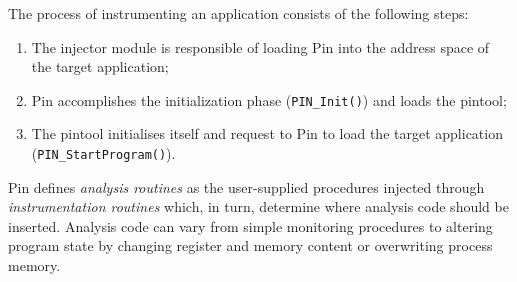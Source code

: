 \documentclass[LaM,binding=0.6cm]{sapthesis}
\begin{document}
\noindent
The process of instrumenting an application consists of the following steps:
\begin{enumerate}
\item The injector module is responsible of loading Pin into the address space of the target application;
\item Pin accomplishes the initialization phase (\texttt{PIN\_Init()}) and loads the pintool;
\item The pintool initialises itself and request to Pin to load the target application (\texttt{PIN\_StartProgram()}).
\end{enumerate}
Pin defines \textit{analysis routines} as the user-supplied procedures injected through \textit{instrumentation routines} which, in turn, determine where analysis code should be inserted. Analysis code can vary from simple monitoring procedures to altering program state by changing register and memory content or overwriting process memory.
\end{document}
